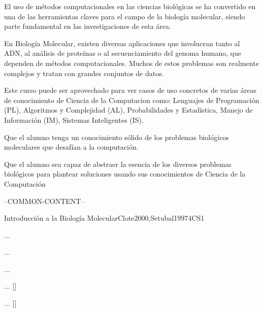 \begin{syllabus}

	
	\begin{justification}
	El uso de métodos computacionales en las ciencias biológicas se ha convertido en una de las herramientas claves para el campo de la biología molecular, siendo parte fundamental en las investigaciones de esta área. 
	
	En Biología Molecular, existen diversas aplicaciones que involucran tanto al ADN, al análisis de proteínas o al secuenciamiento del genoma humano, que dependen de métodos computacionales. Muchos de estos problemas son realmente complejos y tratan con grandes conjuntos de datos. 
	
	Este curso puede ser aprovechado para ver casos de uso concretos de varias áreas de conocimiento de Ciencia de la Computacion como: Lenguajes de Programación (PL), Algoritmos y Complejidad (AL), Probabilidades y Estadística, Manejo de Información (IM), Sistemas Inteligentes (IS).
	\end{justification}
	
	\begin{goals}
	\item Que el alumno tenga un conocimiento sólido de los problemas biológicos moleculares que desafían a la computación.
	\item Que el alumno sea capaz de abstraer la esencia de los diversos problemas biológicos para plantear soluciones usando sus conocimientos de Ciencia de la Computación
	\end{goals}
	
	--COMMON-CONTENT--
	
	\begin{unit}{Introducción a la Biología Molecular}{}{Clote2000,Setubal1997}{4}{CS1}
	\begin{topics}
			\item ... 
			\item ...
			\item ...
	\end{topics}
	\begin{learningoutcomes}
			\item ... [\Familiarity]
			\item ... [\Assessment]
	\end{learningoutcomes}
	\end{unit}
	
	\begin{coursebibliography}
	\end{coursebibliography}
	
	\end{syllabus}
	